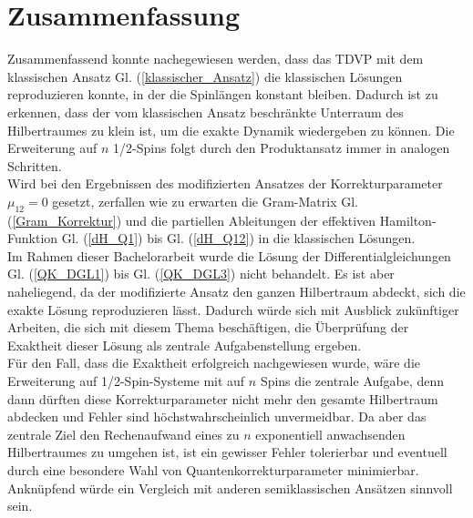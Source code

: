 \chapter{Zusammenfassung}
Zusammenfassend konnte nachegewiesen werden, dass das TDVP mit dem klassischen Ansatz Gl. (\ref{klassischer_Ansatz}) die klassischen Lösungen reproduzieren 
konnte, in der die Spinlängen konstant bleiben. Dadurch ist zu erkennen, dass der vom klassischen Ansatz beschränkte Unterraum des Hilbertraumes zu klein
ist, um die exakte Dynamik wiedergeben zu können. Die Erweiterung auf $n$ 1/2-Spins folgt durch den Produktansatz immer in analogen Schritten.\\
Wird bei den Ergebnissen des modifizierten Ansatzes der Korrekturparameter $\mu_{12}=0$ gesetzt, zerfallen wie zu erwarten
die Gram-Matrix Gl. (\ref{Gram_Korrektur}) und die partiellen Ableitungen der effektiven Hamilton-Funktion Gl. (\ref{dH_Q1}) bis Gl. (\ref{dH_Q12})
in die klassischen Lösungen.\\

Im Rahmen dieser Bachelorarbeit wurde die Lösung der Differentialgleichungen Gl. (\ref{QK_DGL1}) bis Gl. (\ref{QK_DGL3}) nicht behandelt. Es ist 
aber naheliegend, da der modifizierte Ansatz den ganzen Hilbertraum abdeckt, sich die exakte Lösung reproduzieren lässt. Dadurch würde sich 
mit Ausblick zukünftiger Arbeiten, die sich mit diesem Thema beschäftigen, die Überprüfung der Exaktheit dieser Lösung als zentrale Aufgabenstellung ergeben. \\
Für den Fall, dass die Exaktheit erfolgreich nachgewiesen wurde, wäre die Erweiterung auf 1/2-Spin-Systeme mit auf $n$ Spins die zentrale Aufgabe, 
denn dann dürften diese Korrekturparameter nicht mehr den gesamte Hilbertraum abdecken und Fehler sind höchstwahrscheinlich unvermeidbar. 
Da aber das zentrale Ziel den Rechenaufwand eines zu $n$ exponentiell anwachsenden Hilbertraumes zu umgehen ist, ist 
ein gewisser Fehler tolerierbar und eventuell durch eine besondere Wahl von Quantenkorrekturparameter minimierbar. Anknüpfend würde ein Vergleich mit 
anderen semiklassischen Ansätzen sinnvoll sein.
